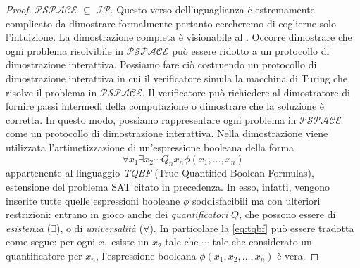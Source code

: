 \documentclass{article}
\theoremstyle{definition}
\begin{document}
\begin{proof}
    \texttt{$\mathcal{PSPACE}$} $\subseteq$ \texttt{$\mathcal{IP}$}. Questo verso dell'uguaglianza è estremamente complicato da dimostrare formalmente pertanto cercheremo di coglierne solo l'intuizione. La dimostrazione completa è visionabile al \cite{ipeqpspace}. Occorre dimostrare che ogni problema risolvibile in \texttt{$\mathcal{PSPACE}$} può essere ridotto a un protocollo di dimostrazione interattiva. Possiamo fare ciò costruendo un protocollo di dimostrazione interattiva in cui il verificatore simula la macchina di Turing che risolve il problema in \texttt{$\mathcal{PSPACE}$}. Il verificatore può richiedere al dimostratore di fornire passi intermedi della computazione o dimostrare che la soluzione è corretta. In questo modo, possiamo rappresentare ogni problema in \texttt{$\mathcal{PSPACE}$} come un protocollo di dimostrazione interattiva. Nella dimostrazione \cite{ipeqpspace} viene utilizzata l'artimetizzazione di un'espressione booleana della forma
    \begin{equation}\label{eq:tqbf}
        \forall x_1 \exists x_2 \cdots Q_nx_n \phi(x_1, \dots, x_n) 
    \end{equation}
    appartenente al linguaggio \emph{TQBF} (True Quantified Boolean Formulas), estensione del problema SAT citato in precedenza. In esso, infatti, vengono inserite tutte quelle espressioni booleane $\phi$ soddisfacibili ma con ulteriori restrizioni: entrano in gioco anche dei \emph{quantificatori} $Q$, che possono essere di \emph{esistenza} ($\exists$), o di \emph{universalità} ($\forall$). In particolare la \ref{eq:tqbf} può essere tradotta come segue:
    per ogni $x_1$ esiste un $x_2$ tale che $\cdots$ tale che considerato un quantificatore per $x_n$, l'espressione booleana $\phi(x_1, x_2, \dots, x_n)$ è vera.
\end{proof}
\end{document}
